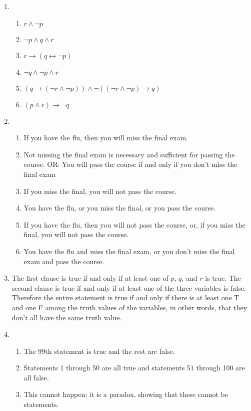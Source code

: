 \documentclass{../../cls/sig-alternate-05-2015}
\begin{document}
\begin{enumerate}
\item
\begin{enumerate}
\item $r \wedge \neg  p$
\item $\neg p \wedge q\wedge r$
\item $r \rightarrow (q \leftrightarrow \neg p) $
\item $\neg q \wedge \neg p \wedge r$
\item $(q \rightarrow (\neg r\wedge \neg p))\wedge \neg((\neg r \wedge \neg p) \rightarrow q)$
\item $(p \wedge r) \rightarrow \neg q$
\end{enumerate}
\item
\begin{enumerate}
	\item If you have the flu, then you will miss the final exam.

	\item Not missing the final exam is necessary and sufficient for passing the course. OR: You
	will pass the course if and only if you don't miss the final exam
	\item If you miss the final, you will not pass the course.
	\item You have the flu, or you miss the final, or you pass the course.
	\item If you have the flu, then you will not pass the course, or, if you miss the final, you will
	not pass the course.
	\item You have the flu and miss the final exam, or you don't miss the final exam and pass
	the course.
\end{enumerate}

\item The first clause is true if and only if at least one of $p$, $q$, and
$r$ is true. The second clause is true if and only if at least one of
the three variables is false. Therefore the entire statement is
true if and only if there is at least one T and one F among the
truth values of the variables, in other words, that they don\textquoteright t all
have the same truth value.

\item 
\begin{enumerate}
	\item The
	99th statement is true and the rest are false.
	\item Statements
	1 through 50 are all true and statements 51 through 100 are
	all false.
	\item This cannot happen; it is a paradox, showing that
	these cannot be statements.
\end{enumerate}

\end{enumerate}
\end{document}
